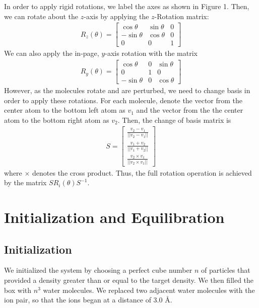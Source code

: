 \documentclass[12pt]{article}
\begin{document}
In order to apply rigid rotations, we label the axes as shown in Figure 1. Then, we can rotate about the $z$-axis by applying the $z$-Rotation matrix:
\begin{gather*}
    R_{z}(\theta) = \begin{bmatrix}
        \cos \theta & \sin \theta & 0\\
        -\sin \theta & \cos \theta & 0\\
        0 & 0 &1
        \end{bmatrix}
\end{gather*}
We can also apply the in-page, $y$-axis rotation with the matrix
\begin{gather*}
    R_{y}(\theta) = \begin{bmatrix}
    \cos \theta & 0 & \sin \theta \\
    0 & 1 & 0\\
    -\sin \theta & 0 & \cos \theta
    \end{bmatrix}
\end{gather*}
However, as the molecules rotate and are perturbed, we need to change basis in order to apply these rotations. For each molecule, denote the vector from the center atom to the bottom left atom as $v_{1}$ and the vector from the the center atom to the bottom right atom as $v_{2}$. Then, the change of basis matrix is
\begin{gather*}
    S = \begin{bmatrix} \frac{v_{2} - v_{1}}{||v_{2} - v_{1}||}\\
        \frac{v_{1} + v_{2}}{||v_{1} + v_{2}||}\\
        \frac{v_{2} \times v_{1}}{||v_{2} \times v_{1}||}
    \end{bmatrix}
\end{gather*}
where $\times$ denotes the cross product. Thus, the full rotation operation is achieved by the matrix $SR_{i}(\theta)S^{-1}$.

\section{Initialization and Equilibration}
\subsection{Initialization}
We initialized the system by choosing a perfect cube number $n$ of particles that provided a density greater than or equal to the target density. We then filled the box with $n^{3}$ water molecules. We  replaced two adjacent water molecules with the ion pair, so that the ions began at a distance of 3.0 \AA.
\end{document}
